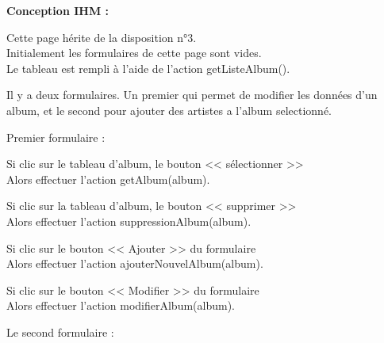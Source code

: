 \begin{paragraphe}
			\begin{paragraphe}
				\textbf{Conception IHM :}
			\end{paragraphe}

			\begin{paragraphe}
				Cette page hérite de la disposition n°3. \\
				Initialement les formulaires de cette page sont vides. \\
				Le tableau est rempli à l'aide de l'action getListeAlbum().
			\end{paragraphe}


			\begin{paragraphe}
				Il y a deux formulaires. Un premier qui permet de modifier les données d'un album, et le second pour ajouter des artistes a l'album selectionné.
			\end{paragraphe}

			\begin{paragraphe}
				Premier formulaire :
			\end{paragraphe}

			\begin{paragraphe}
				Si clic sur le tableau d'album, le bouton << sélectionner >> \\
				Alors effectuer l'action getAlbum(album).
			\end{paragraphe}

			\begin{paragraphe}
				Si clic sur la tableau d'album, le bouton << supprimer >> \\
				Alors effectuer l'action suppressionAlbum(album).
			\end{paragraphe}

			\begin{paragraphe}
				Si clic sur le bouton << Ajouter >> du formulaire \\
				Alors effectuer l'action ajouterNouvelAlbum(album).
			\end{paragraphe}

			\begin{paragraphe}
				Si clic sur le bouton << Modifier >> du formulaire \\
				Alors effectuer l'action modifierAlbum(album).
			\end{paragraphe}

			\begin{paragraphe}
				Le second formulaire :
			\end{paragraphe}


\end{paragraphe}
